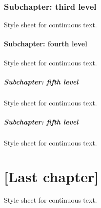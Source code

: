 \subsection{Subchapter: third level}
Style sheet for continuous text.

\subsubsection{Subchapter: fourth level}
Style sheet for continuous text.

\paragraph{Subchapter: fifth level}\mbox{}\newline
Style sheet for continuous text.

\paragraph{Subchapter: fifth level}\mbox{}\newline
Style sheet for continuous text.


\chapter{[Last chapter]}
Style sheet for continuous text.
